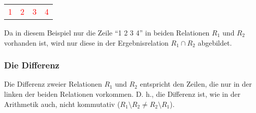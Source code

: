 \begin{center}
\begin{small}
\begin{minipage}[b]{.2\linewidth}
        \end{minipage}
        \hfil
        \begin{minipage}[b]{.2\linewidth}
            \begin{center}
                \tabletail{
                    \hline
                }
                \tablelasttail{
                    \hline
                }
                \begin{supertabular}{|c|c|c|c|}
                    \textcolor{red}{1} & \textcolor{red}{2} & \textcolor{red}{3} & \textcolor{red}{4} \\
                \end{supertabular}
            \end{center}
        \end{minipage}
    \end{small}
\end{center}
Da in diesem Beispiel nur die Zeile \enquote{1 2 3 4} in beiden Relationen $R_1$ und $R_2$ vorhanden ist, wird nur diese in der Ergebnisrelation $R_1\cap R_2$ abgebildet.
\subsubsection{Die Differenz}
Die Differenz zweier Relationen $R_1$ und $R_2$ entspricht den Zeilen, die nur in der linken der beiden Relationen vorkommen. D. h., die Differenz ist, wie in der Arithmetik auch, nicht kommutativ ($R_1 \setminus R_2 \neq R_2 \setminus R_1$).

